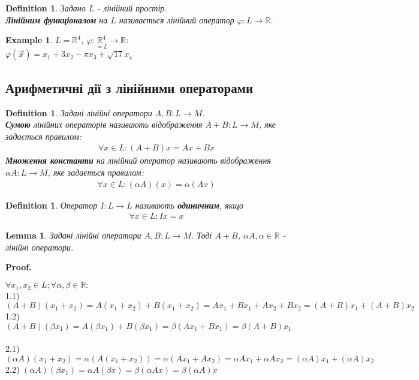 \documentclass[a4paper, 10pt]{article}
\makeatletter
\theoremstyle{theoremdd}
\newtheorem{definition}[theorem]{Definition}
\newtheorem{example}[theorem]{Example}
\newtheorem{lemma}[theorem]{Lemma}
\renewenvironment{proof}[1][Proof.\\]{\par
\pushQED{\hfill \qed}%
\normalfont \topsep6\p@\@plus6\p@\relax
\trivlist
\item\relax
{\bfseries
#1\@addpunct{.}}\hspace\labelsep\ignorespaces
}{%
\popQED\endtrivlist\@endpefalse
}
\makeatother
\begin{document}
	\begin{definition}
	Задано $L$ - лінійний простір.\\
	\textbf{Лінійним функціоналом} на $L$ називається лінійний оператор $\varphi: L \to \mathbb{R}$.
	\end{definition}
	
	\begin{example}
	$L=\mathbb{R}^4$, $\varphi: \underset{=L}{\mathbb{R}^4} \to \mathbb{R}:$\\
	$\varphi(\vec{x}) = x_1 + 3x_2 - \pi x_3 + \sqrt{17}x_4$
	\end{example}
	
	\subsection{Арифметичні дії з лінійними операторами}
	\begin{definition}
	Задані лінійні оператори $A,B: L \to M$.\\
	\textbf{Сумою} лінійних операторів називають відображення $A+B: L \to M$, яке задається правилом:
	\begin{align*}
	\forall x \in L: (A+B)x = Ax+Bx
	\end{align*}
	\textbf{Множення константи} на лінійний оператор називають відображення $\alpha A: L \to M$, яке задається правилом:
	\begin{align*}
	\forall x \in L: (\alpha A)(x) = \alpha (Ax)
	\end{align*}
	\end{definition}
	
	\begin{definition}
	Оператор $I: L \to L$ називають \textbf{одиничним}, якщо
	\begin{align*}
	\forall x \in L: Ix = x
	\end{align*}
	\end{definition}
	
	\begin{lemma}
	Задані лінійні оператори $A,B: L \to M$. Тоді $A+B$, $\alpha A, \alpha \in \mathbb{R}$ - лінійні оператори.
	\end{lemma}
	
	\begin{proof}
	$\forall x_1, x_2 \in L; \forall \alpha, \beta \in \mathbb{R}:$\\
	1.1) $(A+B)(x_1+x_2) = A(x_1+x_2)+B(x_1+x_2)=Ax_1+Bx_1+Ax_2+Bx_2=(A+B)x_1 + (A+B)x_2$\\
	1.2) $(A+B)(\beta x_1) = A(\beta x_1)+B(\beta x_1)=\beta (Ax_1+Bx_1) = \beta(A+B)x_1$\\
	\\
	2.1) $(\alpha A)(x_1+x_2) = \alpha(A(x_1+x_2))=\alpha(Ax_1 + Ax_2) = \alpha Ax_1 + \alpha Ax_2 = (\alpha A)x_1 + (\alpha A)x_2$\\
	2.2) $(\alpha A) (\beta x_1) = \alpha A(\beta x) = \beta(\alpha Ax) = \beta (\alpha A)x$
	\end{proof}
	
\end{document}
